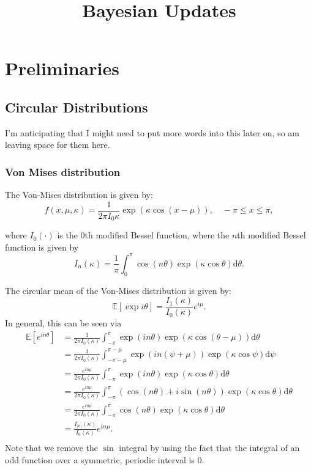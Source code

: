 \documentclass[]{report}
\title{Bayesian Updates}
\begin{document}
\maketitle
\chapter{Preliminaries}

\section{Circular Distributions}
I'm anticipating that I might need to put more words into this later on, so am leaving space for them here.

\subsection{Von Mises distribution}
The Von-Mises distribution is given by:
\[
f(x, \mu, \kappa) = \frac{1}{2 \pi I_0{\kappa}} \exp(\kappa \cos(x-\mu)), \quad - \pi \le x \le \pi,
\]

where $I_0(\cdot)$ is the $0$th modified Bessel function, where the $n$th modified Bessel function is given by
\[
I_{n}(\kappa) = \frac{1}{\pi} \int_0^\pi \cos(n\theta) \exp(\kappa \cos \theta) \text{d}\theta.
\]

The circular mean of the Von-Mises distribution is given by:
 \[
	 \mathbb{E}\left[ \exp i  \theta \right]   = \frac{I_1\left( \kappa \right) }{I_0 \left( \kappa \right) }e^{i \mu}
.\]
In general, this can be seen via
\begin{align*}
	\mathbb{E} [e^{i n \theta}] &= \frac{1}{2\pi I_0 \left( \kappa \right) }\int_{-\pi}^{\pi}\exp\left( in \theta \right) \exp\left( \kappa \cos( \theta - \mu) \right) \text{d}\theta\\
				    &= \frac{1}{2\pi I_0\left( \kappa \right) }\int_{-\pi - \mu}^{\pi - \mu}\exp(in (\psi + \mu)) \exp\left( \kappa \cos\psi  \right) \text{d}\psi \\
				    &= \frac{e^{in \mu} }{2\pi I_0\left( \kappa \right) }\int_{-\pi}^{\pi} \exp\left( i n \theta \right) \exp \left( \kappa \cos\theta  \right) \text{d}\theta \\
				    &= \frac{e^{in \mu}}{2\pi I_0 (\kappa)} \int_{- \pi}^{\pi} \left( \cos( n \theta) + i \sin (n \theta)  \right) \exp\left( \kappa \cos \theta \right) \text{d} \theta \\
				    &= \frac{e^{in \mu}}{2\pi I_0\left( \kappa \right) } \int_{-\pi}^{\pi} \cos\left( n\theta \right)  \exp \left( \kappa \cos \theta \right) \text{d}\theta \\
				    &= \frac{I_{|n|}(\kappa)}{I_0(\kappa)} e^{i n \mu}. \\
\end{align*}
Note that we remove the $\sin$ integral by using the fact that the integral of an odd function over a symmetric, periodic interval is $0$.
\end{document}

